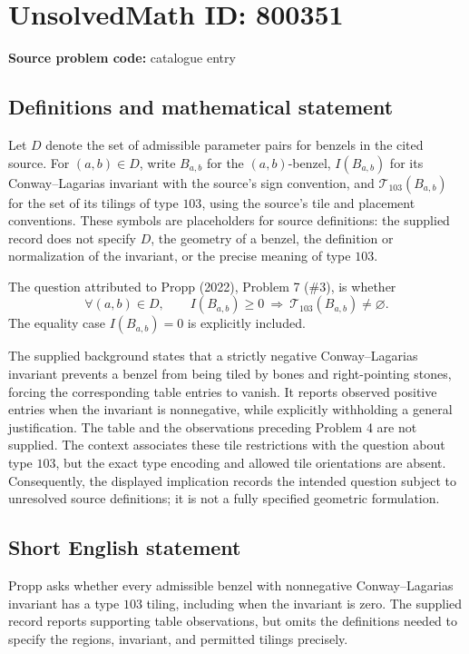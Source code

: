 \documentclass[11pt]{article}
\begin{document}
\section*{UnsolvedMath ID: 800351}
\textbf{Source problem code:} catalogue entry
\subsection{Definitions and mathematical statement}
Let \(D\) denote the set of admissible parameter pairs for benzels in the cited source. For \((a,b)\in D\), write \(B_{a,b}\) for the \((a,b)\)-benzel, \(I(B_{a,b})\) for its Conway--Lagarias invariant with the source's sign convention, and \(\mathcal T_{103}(B_{a,b})\) for the set of its tilings of type \(103\), using the source's tile and placement conventions. These symbols are placeholders for source definitions: the supplied record does not specify \(D\), the geometry of a benzel, the definition or normalization of the invariant, or the precise meaning of type \(103\).

The question attributed to Propp (2022), Problem 7 (\#3), is whether
\[
\forall (a,b)\in D,\qquad I(B_{a,b})\geq 0
\ \Longrightarrow\ 
\mathcal T_{103}(B_{a,b})\neq\varnothing.
\]
The equality case \(I(B_{a,b})=0\) is explicitly included.

The supplied background states that a strictly negative Conway--Lagarias invariant prevents a benzel from being tiled by bones and right-pointing stones, forcing the corresponding table entries to vanish. It reports observed positive entries when the invariant is nonnegative, while explicitly withholding a general justification. The table and the observations preceding Problem 4 are not supplied. The context associates these tile restrictions with the question about type \(103\), but the exact type encoding and allowed tile orientations are absent. Consequently, the displayed implication records the intended question subject to unresolved source definitions; it is not a fully specified geometric formulation.
\subsection{Short English statement}
Propp asks whether every admissible benzel with nonnegative Conway--Lagarias invariant has a type \(103\) tiling, including when the invariant is zero. The supplied record reports supporting table observations, but omits the definitions needed to specify the regions, invariant, and permitted tilings precisely.
\end{document}
